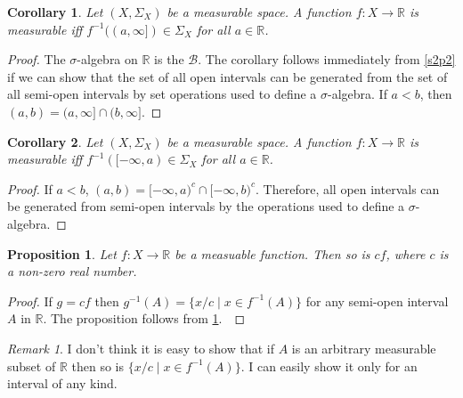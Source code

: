 \documentclass{article}
\newcommand{\sor}{\mathbb{R}}
\theoremstyle{plain}
\numberwithin{thm}{section}
\theoremstyle{plain}
\newtheorem{prop}{Proposition}
\numberwithin{prop}{section}
\theoremstyle{definition}
\numberwithin{defn}{section}
\theoremstyle{remark}
\newtheorem*{rem}{Remark}
\theoremstyle{plain}
\newtheorem{cor}{Corollary}
\numberwithin{cor}{section}
\numberwithin{equation}{section}
\begin{document}
\begin{cor}\label{s2c2}
Let $(X, \Sigma_X)$ be a measurable space. A function $f: X \rightarrow \sor$
is measurable iff $f^{-1}((a, \infty]) \in \Sigma_X$ for all $a \in \sor$.
\end{cor}
\begin{proof}
The $\sigma$-algebra on $\sor$ is the $\mathcal{B}$. The corollary follows
immediately from \ref{s2p2} if we can show that the set of all open intervals
can be generated from the set of all semi-open intervals by set operations used
to define a $\sigma$-algebra. If $a < b$, then $(a, b) = (a, \infty] \cap (b,
\infty]$.
\end{proof}

\begin{cor}\label{s2c3}
Let $(X, \Sigma_X)$ be a measurable space. A function $f: X \rightarrow \sor$
is measurable iff $f^{-1}([-\infty, a) \in \Sigma_X$ for all $a \in \sor$.
\end{cor}
\begin{proof}
If $a < b$, $(a, b) = [-\infty, a)^c \cap [-\infty, b)^c$. Therefore, all open
intervals can be generated from semi-open intervals by the operations used to
define a $\sigma$-algebra.
\end{proof}

\begin{prop}\label{s2p3}
Let $f: X \rightarrow \sor$ be a measuable function. Then so is $cf$, where $c$
is a non-zero real number.
\end{prop}
\begin{proof}
If $g = cf$ then $g^{-1}(A) = \{x/c \;|\; x \in f^{-1}(A)\}$ for any semi-open 
interval $A$ in $\mathbb{R}$. The proposition follows from \ref{s2c2}.\
\end{proof}

\begin{rem}
I don't think it is easy to show that if $A$ is an arbitrary measurable subset 
of $\sor$ then so is $\{x/c \;|\; x \in f^{-1}(A)\}$. I can easily show it only 
for an interval of any kind.
\end{rem}
\end{document}
